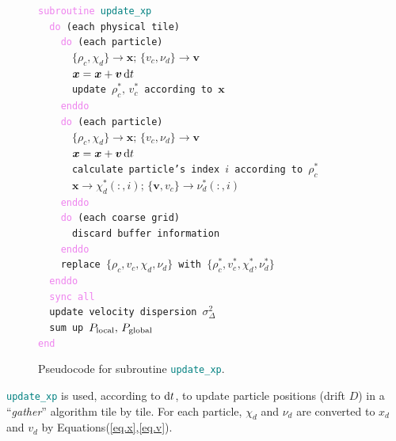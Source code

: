 \documentclass[10pt,twocolumn,reprint]{emulateapj}
\newcommand{\bs}{\boldsymbol}
\newcommand{\tcv}{\textcolor{violet}}
\newcommand{\tcx}{\textcolor{teal}}
\begin{document}
\begin{figure}[t]
{\tt \tcv{subroutine} \tcx{update\_xp}\\
\indent \ \ \tcv{do} (each physical tile)\\
\indent \ \ \ \ \tcv{do} (each particle)\\
\indent \ \ \ \ \ \ $\{\rho_c,\chi_d\}\rightarrow {\bs x};\,\{v_c,\nu_d\}\rightarrow {\bs v}$\\
\indent \ \ \ \ \ \ ${\bs x}={\bs x}+{\bs v}\,{\rm d}t$\\
\indent \ \ \ \ \ \ update $\rho_c^*,\,v_c^*$ according to ${\bs x}$\\
\indent \ \ \ \ \tcv{enddo}\\
\indent \ \ \ \ \tcv{do} (each particle)\\
\indent \ \ \ \ \ \ $\{\rho_c,\chi_d\}\rightarrow {\bs x};\,\{v_c,\nu_d\}\rightarrow {\bs v}$\\
\indent \ \ \ \ \ \ ${\bs x}={\bs x}+{\bs v}\,{\rm d}t$\\
\indent \ \ \ \ \ \ calculate particle's index $i$ according to $\rho_c^*$\\
\indent \ \ \ \ \ \ ${\bs x}\rightarrow\chi_d^*(:,i);\,\{{\bs v},v_c\}\rightarrow\nu_d^*(:,i)$\\
\indent \ \ \ \ \tcv{enddo}\\
\indent \ \ \ \ \tcv{do} (each coarse grid)\\
\indent \ \ \ \ \ \ discard buffer information\\
\indent \ \ \ \ \tcv{enddo}\\
\indent \ \ \ \ replace $\{\rho_c,v_c,\chi_d,\nu_d\}$ with $\{\rho_c^*,v_c^*,\chi_d^*,\nu_d^*\}$\\
\indent \ \ \tcv{enddo}\\
\indent \ \ \tcv{sync all}\\
\indent \ \ update velocity dispersion $\sigma^2_{\Delta}$\\
\indent \ \ sum up $P_{\rm local},\,P_{\rm global}$\\
\tcv{end}\\}
\caption{Pseudocode for subroutine {\tt \tcx{update\_xp}}.}
\label{fig.update_xp}
\end{figure}


{\tt \tcx{update\_xp}}
is used, according to ${\rm d}t$, to update particle positions (drift $D$) in a ``{\it gather}'' algorithm tile by tile. For each particle, $\chi_d$ and $\nu_d$ are converted to $x_d$ and $v_d$ by Equations(\ref{eq.x},\ref{eq.v}).
\end{document}
